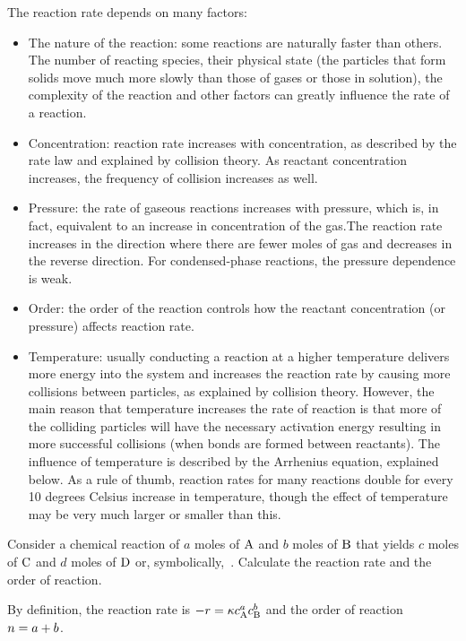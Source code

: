 The reaction rate depends on many factors:
\begin{itemize}
\item The nature of the reaction: some reactions are naturally faster than others. The number of reacting species, their physical state (the particles that form solids move much more slowly than those of gases or those in solution), the complexity of the reaction and other factors can greatly influence the rate of a reaction.
%
\item Concentration: reaction rate increases with concentration, as described by the rate law and explained by collision theory. As reactant concentration increases, the frequency of collision increases as well.
%
\item Pressure: the rate of gaseous reactions increases with pressure, which is, in fact, equivalent to an increase in concentration of the gas.The reaction rate increases in the direction where there are fewer moles of gas and decreases in the reverse direction. For condensed-phase reactions, the pressure dependence is weak.
%
\item Order: the order of the reaction controls how the reactant concentration (or pressure) affects reaction rate.
%
\item Temperature: usually conducting a reaction at a higher temperature delivers more energy into the system and increases the reaction rate by causing more collisions between particles, as explained by collision theory. However, the main reason that temperature increases the rate of reaction is that more of the colliding particles will have the necessary activation energy resulting in more successful collisions (when bonds are formed between reactants). The influence of temperature is described by the Arrhenius equation, explained below. As a rule of thumb, reaction rates for many reactions double for every 10 degrees Celsius increase in temperature, though the effect of temperature may be very much larger or smaller than this.
\end{itemize}

\begin{example}
Consider a chemical reaction of $a$ moles of $\ce A$ and $b$ moles of $\ce B$ that yields $c$ moles of $\ce C$ and $d$ moles of $\ce D$ or, symbolically,
\beq
{}\,.
\eeq
Calculate the reaction rate and the order of reaction.
\end{example}

\begin{solution}
By definition, the reaction rate is $-\rrate = \krcoeff\conc A^a\conc B^b$ and the order of reaction $n = a + b$.
\end{solution}

